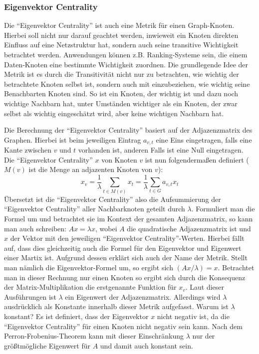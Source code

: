 \documentclass[a4paper,12pt,ngerman,chapterprefix=false,listof=totoc,bibliography=totoc]{scrreprt}
\begin{document}
\subsubsection*{Eigenvektor Centrality}
{
Die "`Eigenvektor Centrality"' ist auch eine Metrik für einen Graph-Knoten. Hierbei soll nicht nur darauf geachtet werden, inwieweit ein Knoten direkten Einfluss auf eine Netzstruktur hat, sondern auch seine transitive Wichtigkeit betrachtet werden. Anwendungen können z.B. Ranking-Systeme sein, die einem Daten-Knoten eine bestimmte Wichtigkeit zuordnen. \cite{neo4j_eigenvector_2020} Die grundlegende Idee der Metrik ist es durch die Transitivität nicht nur zu betrachten, wie wichtig der betrachtete Knoten selbst ist, sondern auch mit einzubeziehen, wie wichtig seine Benachbarten Knoten sind. So ist ein Knoten, der wichtig ist und dazu noch wichtige Nachbarn hat, unter Umständen wichtiger als ein Knoten, der zwar selbst als wichtig eingeschätzt wird, aber keine wichtigen Nachbarn hat.

Die Berechnung der "`Eigenvektor Centrality"' basiert auf der Adjazenzmatrix des Graphen. Hierbei ist beim jeweiligen Eintrag \(a_{v,t}\) eine Eins eingetragen, falls eine Kante zwischen \(v\) und \(t\) vorhanden ist, anderen Falls ist eine Null eingetragen. Die "`Eigenvektor Centrality"' \(x\) von Knoten \(v\) ist nun folgendermaßen definiert (\(M(v)\) ist die Menge an adjazenten Knoten von \(v\)): \cite{bihari_eigenvector_2015}
\[
	x_v=\frac{1}{\lambda}\sum_{t\in M(v)}x_t=\frac{1}{\lambda}\sum_{t\in G}a_{v,t}x_t
\]
Übersetzt ist die "`Eigenvektor Centrality"' also die Aufsummierung der "`Eigenvektor Centrality"' aller Nachbarknoten geteilt durch \(\lambda\). Formuliert man die Formel um und betrachtet sie im Kontext der gesamten Adjazenzmatrix, so kann man auch schreiben: \(Ax=\lambda x\), wobei \(A\) die quadratische Adjazenzmatrix ist und \(x\) der Vektor mit den jeweiligen "`Eigenvektor Centrality"'-Werten. Hierbei fällt auf, dass dies gleichzeitig auch die Formel für den Eigenvektor und Eigenwert einer Martix ist. Aufgrund dessen erklärt sich auch der Name der Metrik. Stellt man nämlich die Eigenvektor-Formel um, so ergibt sich \((Ax/\lambda)=x\). Betrachtet man in dieser Rechnung nur einen Knoten so ergibt sich durch die Konsequenz der Matrix-Multiplikation die erstgenannte Funktion für \(x_v\). Laut dieser Ausführungen ist \(\lambda\) ein Eigenwert der Adjazenzmatrix. Allerdings wird \(\lambda\) ausdrücklich als Konstante innerhalb dieser Metrik aufgefasst. Warum ist \(\lambda\) konstant? Es ist definiert, dass der Eigenvektor \(x\) nicht negativ ist, da die "`Eigenvektor Centrality"' für einen Knoten nicht negativ sein kann. Nach dem Perron-Frobenius-Theorem kann mit dieser Einschränkung \(\lambda\) nur der größtmögliche Eigenwert für \(A\) und damit auch konstant sein.

}
\end{document}

